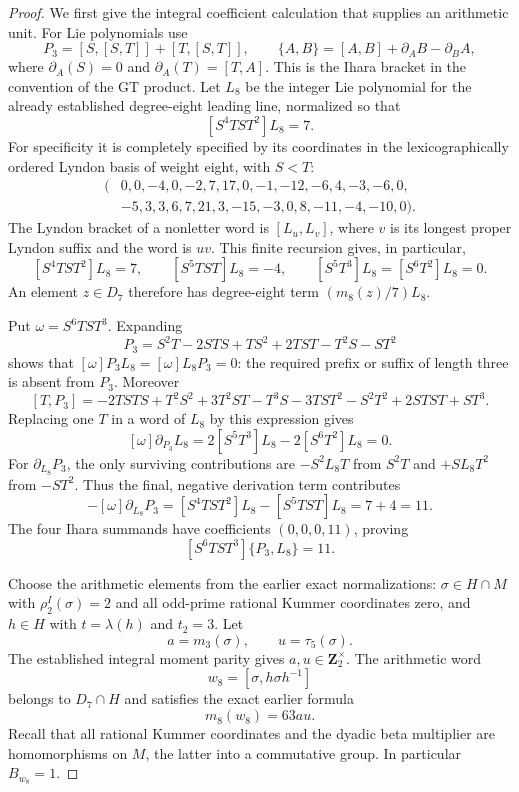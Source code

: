 \begin{proof}
We first give the integral coefficient calculation that supplies an
arithmetic unit. For Lie polynomials use
\[
 P_3=[S,[S,T]]+[T,[S,T]],\qquad
 \{A,B\}=[A,B]+\partial_A B-\partial_B A,
\]
where $\partial_A(S)=0$ and $\partial_A(T)=[T,A]$.
This is the Ihara bracket in the convention of the GT product.
Let $L_8$ be the integer Lie polynomial for the already established
degree-eight leading line, normalized so that
\[
 [S^4TST^2]L_8=7.
\]
For specificity it is completely specified by its coordinates in the
lexicographically ordered Lyndon basis of weight eight, with $S<T$:
\begin{align*}
(&0,0,-4,0,-2,7,17,0,-1,-12,-6,4,-3,-6,0,\\
 &-5,3,3,6,7,21,3,-15,-3,0,8,-11,-4,-10,0).
\end{align*}
The Lyndon bracket of a nonletter word is $[L_u,L_v]$, where $v$
is its longest proper Lyndon suffix and the word is $uv$.
This finite recursion gives, in particular,
\begin{equation}\label{eq:eleven-mixed-four-coefficients}
 [S^4TST^2]L_8=7,\qquad [S^5TST]L_8=-4,\qquad
 [S^5T^3]L_8=[S^6T^2]L_8=0.
\end{equation}
An element $z\in D_7$ therefore has degree-eight term
$(m_8(z)/7)L_8$.

Put $\omega=S^6TST^3$. Expanding
\[
 P_3=S^2T-2STS+TS^2+2TST-T^2S-ST^2
\]
shows that $[\omega]P_3L_8=[\omega]L_8P_3=0$: the required
prefix or suffix of length three is absent from $P_3$. Moreover
\[
 [T,P_3]=-2TSTS+T^2S^2+3T^2ST-T^3S-3TST^2
             -S^2T^2+2STST+ST^3.
\]
Replacing one $T$ in a word of $L_8$ by this expression gives
\[
 [\omega]\partial_{P_3}L_8
     =2[S^5T^3]L_8-2[S^6T^2]L_8=0.
\]
For $\partial_{L_8}P_3$, the only surviving contributions are
$-S^2L_8T$ from $S^2T$ and $+SL_8T^2$ from $-ST^2$.
Thus the final, negative derivation term contributes
\[
 -[\omega]\partial_{L_8}P_3
    =[S^4TST^2]L_8-[S^5TST]L_8=7+4=11.
\]
The four Ihara summands have coefficients $(0,0,0,11)$, proving
\begin{equation}\label{eq:eleven-mixed-bracket-unit}
 [S^6TST^3]\{P_3,L_8\}=11.
\end{equation}

Choose the arithmetic elements from the earlier exact
normalizations: $\sigma\in H\cap M$ with
$\rho_2^I(\sigma)=2$ and all odd-prime rational Kummer coordinates
zero, and $h\in H$ with $t=\lambda(h)$ and $t_2=3$.
Let
\[
 a=m_3(\sigma),\qquad u=\tau_5(\sigma).
\]
The established integral moment parity gives $a,u\in\mathbf Z_2^\times$.
The arithmetic word
\[
 w_8=[\sigma,h\sigma h^{-1}]
\]
belongs to $D_7\cap H$ and satisfies the exact earlier formula
\begin{equation}\label{eq:eleven-mixed-old-eight}
 m_8(w_8)=63au.
\end{equation}
Recall that all rational Kummer coordinates and the dyadic beta
multiplier are homomorphisms on $M$, the latter into a commutative
group. In particular $B_{w_8}=1$.


\end{proof}
